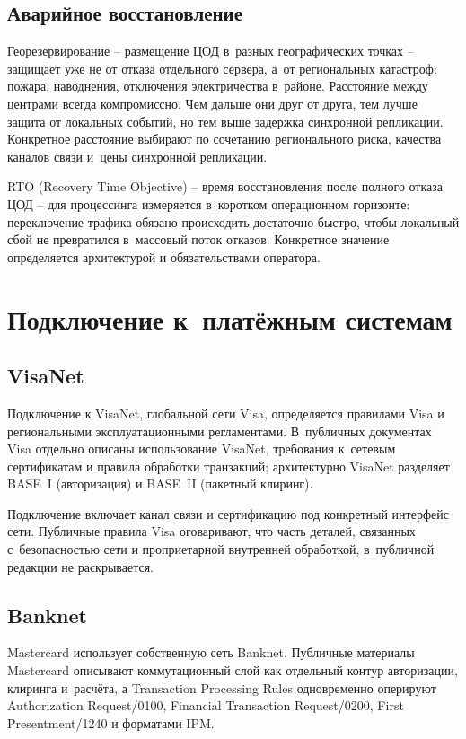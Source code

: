 \subsection*{Аварийное восстановление}

Георезервирование -- размещение ЦОД в~разных географических
точках -- защищает уже не от отказа отдельного сервера,
а~от региональных катастроф: пожара, наводнения, отключения
электричества в~районе. Расстояние между центрами всегда
компромиссно. Чем дальше они друг от друга, тем лучше защита
от локальных событий, но тем выше задержка синхронной репликации.
Конкретное расстояние выбирают по сочетанию регионального риска,
качества каналов связи и~цены синхронной репликации.

RTO (Recovery Time Objective) -- время восстановления
после полного отказа ЦОД -- для процессинга измеряется
в~коротком операционном горизонте: переключение трафика
обязано происходить достаточно быстро, чтобы локальный сбой
не превратился в~массовый поток отказов. Конкретное значение
определяется архитектурой и обязательствами оператора.

\section{Подключение к~платёжным системам}\label{sec:pc-connectivity}

\subsection*{VisaNet}

Подключение к VisaNet, глобальной сети Visa, определяется
правилами Visa и региональными эксплуатационными регламентами.
В~публичных документах Visa отдельно описаны использование
VisaNet, требования к~сетевым сертификатам и правила обработки
транзакций; архитектурно VisaNet разделяет BASE~I (авторизация)
и BASE~II (пакетный клиринг).~\cite{visa-core-rules}

Подключение включает канал связи и сертификацию под конкретный
интерфейс сети. Публичные правила Visa оговаривают, что часть деталей,
связанных с~безопасностью сети и проприетарной внутренней
обработкой,
в~публичной редакции не раскрывается.~\cite{visa-core-rules}

\subsection*{Banknet}

Mastercard использует собственную сеть Banknet.
Публичные материалы Mastercard описывают
коммутационный слой как отдельный контур авторизации,
клиринга и~расчёта, а Transaction Processing Rules
одновременно оперируют Authorization Request/0100,
Financial Transaction Request/0200, First Presentment/1240
и форматами IPM.~\cite{mc-switching-services,mc-tpr}

